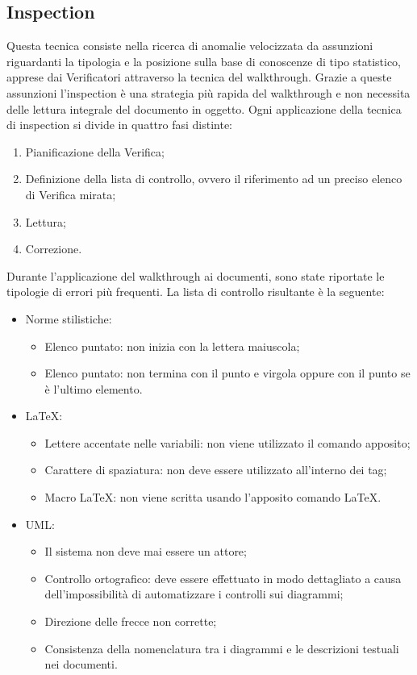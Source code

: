 \subsection{Inspection}
\label{11.3}
Questa tecnica consiste nella ricerca di anomalie velocizzata da assunzioni riguardanti la tipologia e la posizione sulla base di conoscenze di tipo statistico, apprese dai Verificatori attraverso la tecnica del walkthrough. Grazie a queste assunzioni l'inspection è una strategia più rapida del walkthrough e non necessita delle lettura integrale del documento in oggetto.
Ogni applicazione della tecnica di inspection si divide in quattro fasi distinte:
\begin{enumerate}
\item Pianificazione della Verifica;
\item Definizione della lista di controllo, ovvero il riferimento ad un preciso elenco di Verifica mirata;
\item Lettura;
\item Correzione.
\end{enumerate}
Durante l'applicazione del walkthrough ai documenti, sono state riportate le tipologie di errori più frequenti. La lista di controllo risultante è la seguente:
\begin{itemize}
\item Norme stilistiche:
\begin{itemize}
\item Elenco puntato: non inizia con la lettera maiuscola;
\item Elenco puntato: non termina con il punto e virgola oppure con il punto se è l'ultimo elemento.
\end{itemize}
\item \LaTeX:
\begin{itemize}
\item Lettere accentate nelle variabili: non viene utilizzato il comando apposito;
\item Carattere di spaziatura: non deve essere utilizzato all'interno dei tag;
\item Macro \LaTeX: non viene scritta usando l'apposito comando \LaTeX{}.
\end{itemize}
\item UML:
\begin{itemize}
\item Il sistema non deve mai essere un attore;
\item Controllo ortografico: deve essere effettuato in modo dettagliato a causa dell'impossibilità di automatizzare i controlli sui diagrammi;
\item Direzione delle frecce non corrette;
\item Consistenza della nomenclatura tra i diagrammi e le descrizioni testuali nei documenti.
\end{itemize}
\end{itemize}
